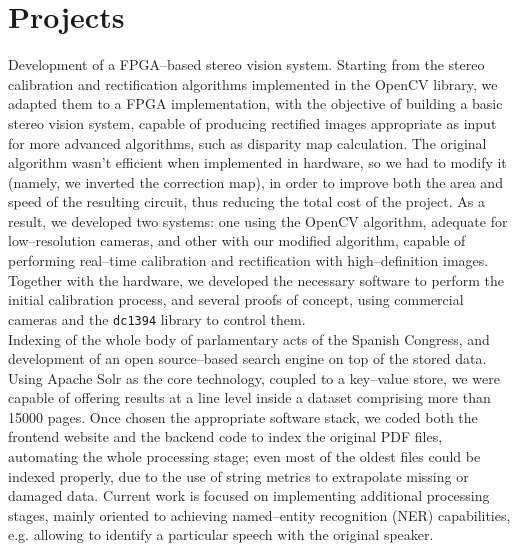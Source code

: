 \documentclass[11pt, a4paper]{article}
\newcommand{\years}[1]{\marginnote{\scriptsize #1}}
\begin{document}
\section*{Projects} %
\noindent
\years{2011}Development of a FPGA--based stereo vision system. Starting from the stereo calibration and rectification algorithms implemented in the OpenCV library, we adapted them to a FPGA implementation, with the objective of building a basic stereo vision system, capable of producing rectified images appropriate as input for more advanced algorithms, such as disparity map calculation. The original algorithm wasn't efficient when implemented in hardware, so we had to modify it (namely, we inverted the correction map), in order to improve both the area and speed of the resulting circuit, thus reducing the total cost of the project. As a result, we developed two systems: one using the OpenCV algorithm, adequate for low--resolution cameras, and other with our modified algorithm, capable of performing real--time calibration and rectification with high--definition images. Together with the hardware, we developed the necessary software to perform the initial calibration process, and several proofs of concept, using commercial cameras and the \texttt{dc1394} library to control them.\\
\years{2011--present}Indexing of the whole body of parlamentary acts of the Spanish Congress, and development of an open source--based search engine on top of the stored data. Using Apache Solr as the core technology, coupled to a key--value store, we were capable of offering results at a line level inside a dataset comprising more than 15000 pages. Once chosen the appropriate software stack, we coded both the frontend website and the backend code to index the original PDF files, automating the whole processing stage; even most of the oldest files could be indexed properly, due to the use of string metrics to extrapolate missing or damaged data. Current work is focused on implementing additional processing stages, mainly oriented to achieving named--entity recognition (NER) capabilities, e.g. allowing to identify a particular speech with the original speaker.
\end{document}
